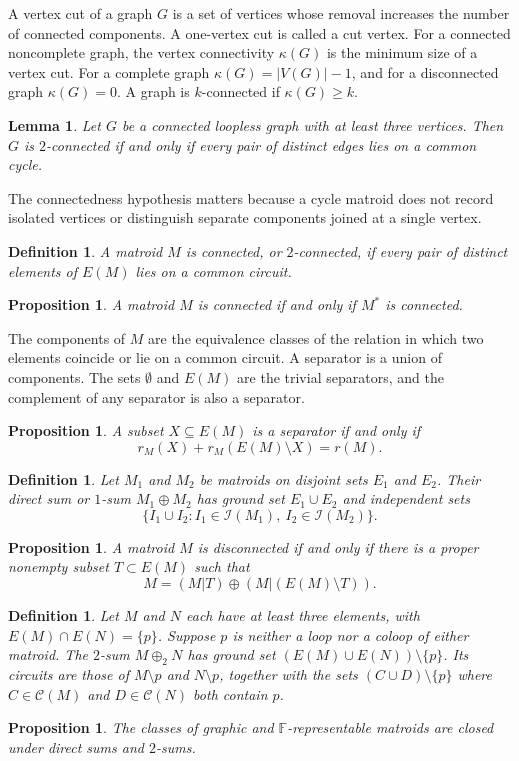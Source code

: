 \documentclass[11pt,letterpaper]{article}
\newcommand{\F}{\mathbb{F}}
\newcommand{\I}{\mathcal{I}}
\newcommand{\C}{\mathcal{C}}
\theoremstyle{appendix-result}
\newtheorem{lemma}[theorem]{Lemma}
\newtheorem{proposition}[theorem]{Proposition}
\theoremstyle{appendix-definition}
\newtheorem{definition}[theorem]{Definition}
\begin{document}
A vertex cut of a graph $G$ is a set of vertices whose removal increases the number of connected components. A one-vertex cut is called a cut vertex. For a connected noncomplete graph, the vertex connectivity $\kappa(G)$ is the minimum size of a vertex cut. For a complete graph $\kappa(G)=|V(G)|-1$, and for a disconnected graph $\kappa(G)=0$. A graph is $k$-connected if $\kappa(G)\geq k$.

\begin{lemma}
    Let $G$ be a connected loopless graph with at least three vertices. Then $G$ is $2$-connected if and only if every pair of distinct edges lies on a common cycle.
\end{lemma}
The connectedness hypothesis matters because a cycle matroid does not record isolated vertices or distinguish separate components joined at a single vertex.
\begin{definition}
    A matroid $M$ is connected, or $2$-connected, if every pair of distinct elements of $E(M)$ lies on a common circuit.
\end{definition}
\begin{proposition}
    A matroid $M$ is connected if and only if $M^*$ is connected.
\end{proposition}
The components of $M$ are the equivalence classes of the relation in which two elements coincide or lie on a common circuit. A separator is a union of components. The sets $\emptyset$ and $E(M)$ are the trivial separators, and the complement of any separator is also a separator.
\begin{proposition}
    A subset $X\subseteq E(M)$ is a separator if and only if
    \[
        r_M(X)+r_M(E(M)\setminus X)=r(M).
    \]
\end{proposition}
\begin{definition}
    Let $M_1$ and $M_2$ be matroids on disjoint sets $E_1$ and $E_2$. Their direct sum or $1$-sum $M_1\oplus M_2$ has ground set $E_1\cup E_2$ and independent sets
    \[
        \{I_1\cup I_2:I_1\in\I(M_1),\ I_2\in\I(M_2)\}.
    \]
\end{definition}
\begin{proposition}
    A matroid $M$ is disconnected if and only if there is a proper nonempty subset $T\subset E(M)$ such that
    \[
        M=(M|T)\oplus(M|(E(M)\setminus T)).
    \]
\end{proposition}
\begin{definition}
    Let $M$ and $N$ each have at least three elements, with $E(M)\cap E(N)=\{p\}$. Suppose $p$ is neither a loop nor a coloop of either matroid. The $2$-sum $M\oplus_2 N$ has ground set $(E(M)\cup E(N))\setminus\{p\}$. Its circuits are those of $M\setminus p$ and $N\setminus p$, together with the sets $(C\cup D)\setminus\{p\}$ where $C\in\C(M)$ and $D\in\C(N)$ both contain $p$.
\end{definition}
\begin{proposition}
    The classes of graphic and $\F$-representable matroids are closed under direct sums and $2$-sums.
\end{proposition}
\end{document}
